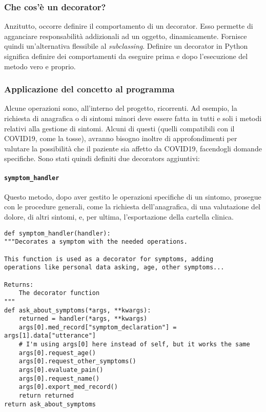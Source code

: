 \subsubsection{Che cos'è un decorator?}
Anzitutto, occorre definire il comportamento di un decorator. Esso permette di agganciare responsabilità addizionali ad un oggetto, dinamicamente. Fornisce quindi un'alternativa flessibile al \textit{subclassing}. Definire un decorator in Python significa definire dei comportamenti da eseguire prima e dopo l'esecuzione del metodo vero e proprio.
\subsubsection{Applicazione del concetto al programma}
Alcune operazioni sono, all'interno del progetto, ricorrenti. Ad esempio, la richiesta di anagrafica o di sintomi minori deve essere fatta in tutti e soli i metodi relativi alla gestione di sintomi. Alcuni di questi (quelli compatibili con il COVID19, come la tosse), avranno bisogno inoltre di approfondimenti per valutare la possibilità che il paziente sia affetto da COVID19, facendogli domande specifiche. Sono stati quindi definiti due decorators aggiuntivi:
\paragraph{\texttt{symptom\_handler}} Questo metodo, dopo aver gestito le operazioni specifiche di un sintomo, prosegue con le procedure generali, come la richiesta dell'anagrafica, di una valutazione del dolore, di altri sintomi, e, per ultima, l'esportazione della cartella clinica.
\begin{verbatim}
def symptom_handler(handler):
"""Decorates a symptom with the needed operations.

This function is used as a decorator for symptoms, adding
operations like personal data asking, age, other symptoms...

Returns:
    The decorator function
"""
def ask_about_symptoms(*args, **kwargs):
    returned = handler(*args, **kwargs)
    args[0].med_record["symptom_declaration"] = args[1].data["utterance"]
    # I'm using args[0] here instead of self, but it works the same
    args[0].request_age()
    args[0].request_other_symptoms()
    args[0].evaluate_pain()
    args[0].request_name()
    args[0].export_med_record()
    return returned
return ask_about_symptoms
\end{verbatim}
